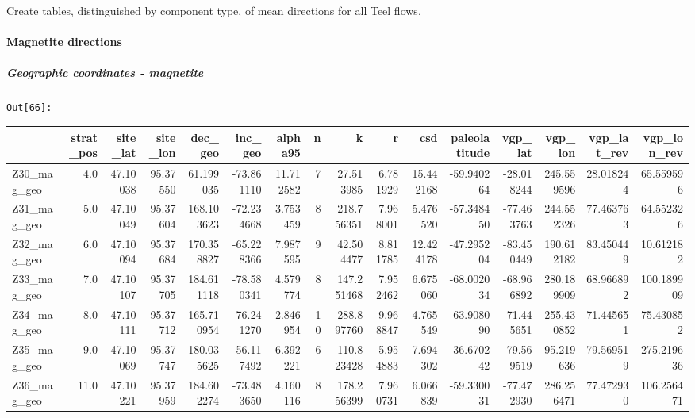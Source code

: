 \documentclass[11pt]{article}
\begin{document}
    Create tables, distinguished by component type, of mean directions for
all Teel flows.

    \paragraph{Magnetite directions}\label{magnetite-directions}

    \subparagraph{Geographic coordinates -
magnetite}\label{geographic-coordinates---magnetite}

\texttt{\color{outcolor}Out[{\color{outcolor}66}]:}
    
    \begin{sidewaystable}
    {\tiny\begin{tabular}{lrrrrrrrrrrrrrrr}
\toprule
{} &  strat\_pos &  site\_lat &  site\_lon &     dec\_geo &    inc\_geo &    alpha95 &   n &           k &         r &        csd &  paleolatitude &    vgp\_lat &     vgp\_lon &  vgp\_lat\_rev &  vgp\_lon\_rev \\
\midrule
Z30\_mag\_geo &        4.0 &  47.10038 &  95.37550 &   61.199035 & -73.861110 &  11.712582 &   7 &   27.513985 &  6.781929 &  15.442168 &     -59.940264 & -28.018244 &  245.559596 &    28.018244 &    65.559596 \\
Z31\_mag\_geo &        5.0 &  47.10049 &  95.37604 &  168.103623 & -72.234668 &   3.753459 &   8 &  218.756351 &  7.968001 &   5.476520 &     -57.348450 & -77.463763 &  244.552326 &    77.463763 &    64.552326 \\
Z32\_mag\_geo &        6.0 &  47.10094 &  95.37684 &  170.358827 & -65.228366 &   7.987595 &   9 &   42.504477 &  8.811785 &  12.424178 &     -47.295204 & -83.450449 &  190.612182 &    83.450449 &    10.612182 \\
Z33\_mag\_geo &        7.0 &  47.10107 &  95.37705 &  184.611118 & -78.580341 &   4.579774 &   8 &  147.251468 &  7.952462 &   6.675060 &     -68.002034 & -68.966892 &  280.189909 &    68.966892 &   100.189909 \\
Z34\_mag\_geo &        8.0 &  47.10111 &  95.37712 &  165.710954 & -76.241270 &   2.846954 &  10 &  288.897760 &  9.968847 &   4.765549 &     -63.908090 & -71.445651 &  255.430852 &    71.445651 &    75.430852 \\
Z35\_mag\_geo &        9.0 &  47.10069 &  95.37747 &  180.035625 & -56.117492 &   6.392221 &   6 &  110.823428 &  5.954883 &   7.694302 &     -36.670242 & -79.569519 &   95.219636 &    79.569519 &   275.219636 \\
Z36\_mag\_geo &       11.0 &  47.10221 &  95.37959 &  184.602274 & -73.483650 &   4.160116 &   8 &  178.256399 &  7.960731 &   6.066839 &     -59.330031 & -77.472930 &  286.256471 &    77.472930 &   106.256471 \\

\end{tabular}}
\end{sidewaystable}
\end{document}
